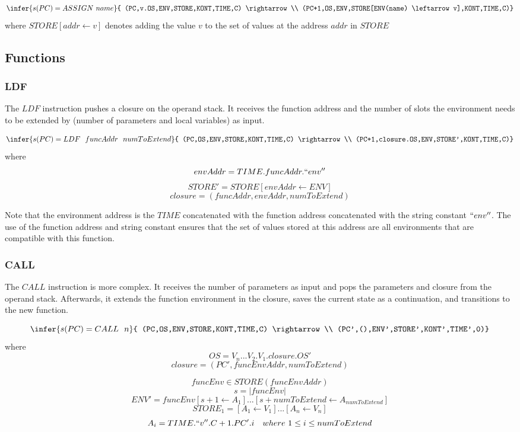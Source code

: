 \documentclass[12pt]{article}
\begin{document}
$$\infer{s(PC) = ASSIGN\ name}{
  (PC,v.OS,ENV,STORE,KONT,TIME,C) \rightarrow \\
  (PC+1,OS,ENV,STORE[ENV(name) \leftarrow v],KONT,TIME,C)}$$
where $STORE[addr \leftarrow v]$ denotes adding the value $v$ to the set of values at the address $addr$ in $STORE$

\subsection{Functions}
\subsubsection{LDF}
The $LDF$ instruction pushes a closure on the operand stack. It receives the function address and the number of slots the environment needs to be extended by (number of parameters and local variables) as input.

$$\infer{s(PC) = LDF\ \ funcAddr\ \ numToExtend}{
    (PC,OS,ENV,STORE,KONT,TIME,C) \rightarrow \\
    (PC+1,closure.OS,ENV,STORE',KONT,TIME,C)}$$
where
$$envAddr=TIME.funcAddr.``env''$$
$$STORE'=STORE[envAddr \leftarrow ENV]$$
$$closure=(funcAddr,envAddr,numToExtend)$$

Note that the environment address is the $TIME$ concatenated with the function address concatenated with the string constant $``env''$. The use of the function address and string constant ensures that the set of values stored at this address are all environments that are compatible with this function.

\subsubsection{CALL}
The $CALL$ instruction is more complex. It receives the number of parameters as input and pops the parameters and closure from the operand stack. Afterwards, it extends the function environment in the closure, saves the current state as a continuation, and transitions to the new function.

$$\infer{s(PC) = CALL\ \ n}{
    (PC,OS,ENV,STORE,KONT,TIME,C) \rightarrow \\
    (PC',(),ENV',STORE',KONT',TIME',0)}$$
where
$$OS=V_n...V_2.V_1.closure.OS'$$
$$closure=(PC',funcEnvAddr,numToExtend)$$

$$funcEnv \in STORE(funcEnvAddr)$$
$$s=|funcEnv|$$
$$ENV'=funcEnv[s+1 \leftarrow A_1]...[s+numToExtend \leftarrow A_{numToExtend}]$$
$$STORE_1=[A_1 \leftarrow V_1]...[A_n \leftarrow V_n]$$
$$A_i=TIME.``v''.C+1.PC'.i \quad where\ 1 \leq i \leq numToExtend$$
\end{document}
